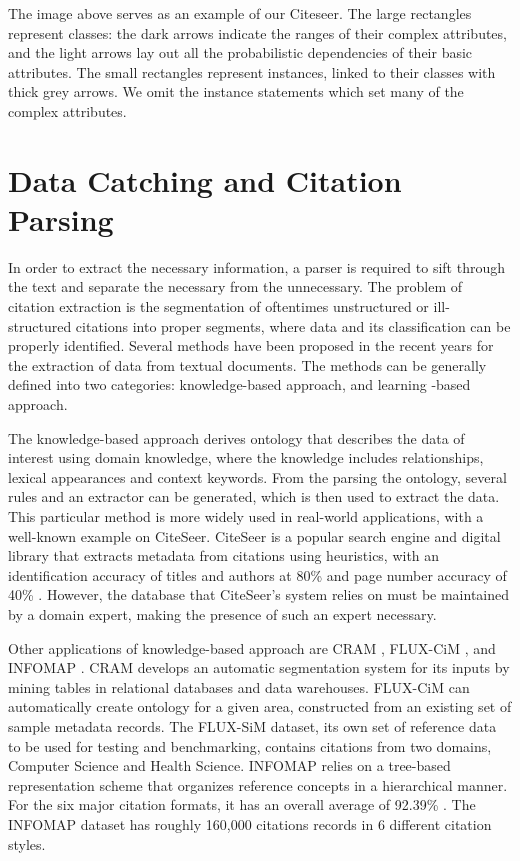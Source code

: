 The image above serves as an example of our Citeseer. The large rectangles represent classes: the dark arrows indicate the ranges of their complex attributes, and the light arrows lay out all the probabilistic dependencies of their basic attributes. The small rectangles represent instances, linked to their classes with thick grey arrows. We omit the instance statements which set many of the complex attributes.

\section{Data Catching and Citation Parsing}

	In order to extract the necessary information, a parser is required to sift through the text and separate the necessary from the unnecessary. The problem of citation extraction is the segmentation of oftentimes unstructured or ill-structured citations into proper segments, where data and its classification can be properly identified. Several methods have been proposed in the recent years for the extraction of data from textual documents. The methods can be generally defined into two categories: knowledge-based approach, and learning -based approach. \cite{bibpro}

	The knowledge-based approach derives ontology that describes the data of interest using domain knowledge, where the knowledge includes relationships, lexical appearances and context keywords. From the parsing the ontology, several rules and an extractor can be generated, which is then used to extract the data. This particular method is more widely used in real-world applications, with a well-known example on CiteSeer. CiteSeer is a popular search engine and digital library that extracts metadata from citations using heuristics, with an identification accuracy of titles and authors at 80\% and page number accuracy of 40\% \cite{citeseer}.  However, the database that CiteSeer’s system relies on must be maintained by a domain expert, making the presence of such an expert necessary.

	Other applications of knowledge-based approach are CRAM \cite{cram}, FLUX-CiM \cite{flux}, and INFOMAP \cite{infmap}. CRAM develops an automatic segmentation system for its inputs by mining tables in relational databases and data warehouses. FLUX-CiM can automatically create ontology for a given area, constructed from an existing set of sample metadata records.  The FLUX-SiM dataset, its own set of reference data to be used for testing and benchmarking, contains citations from two domains, Computer Science and Health Science. INFOMAP relies on a tree-based representation scheme that organizes reference concepts in a hierarchical manner. For the six major citation formats, it has an overall average of 92.39\% \cite{bibpro}. The INFOMAP dataset has roughly 160,000 citations records in 6 different citation styles.

